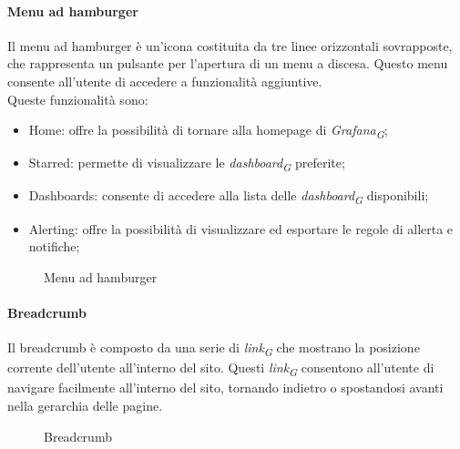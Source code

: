 \paragraph{Menu ad hamburger}
Il menu ad hamburger è un'icona costituita da tre linee orizzontali sovrapposte, che rappresenta un pulsante per l'apertura di un menu a discesa. Questo menu consente all'utente di accedere a funzionalità aggiuntive. \\
Queste funzionalità sono:
\begin{itemize}
    \item Home: offre la possibilità di tornare alla homepage di \textit{Grafana}\textsubscript{\textit{G}};
    \item Starred: permette di visualizzare le \textit{dashboard}\textsubscript{\textit{G}} preferite;
    \item Dashboards: consente di accedere alla lista delle \textit{dashboard}\textsubscript{\textit{G}} disponibili;
    \item Alerting: offre la possibilità di visualizzare ed esportare le regole di allerta e notifiche;
\end{itemize}
\begin{figure}[H]
    \centering
    \caption{Menu ad hamburger}
    \label{fig:my_label}
\end{figure}

\paragraph{Breadcrumb}
Il breadcrumb è composto da una serie di \textit{link}\textsubscript{\textit{G}} che mostrano la posizione corrente dell'utente all'interno del sito. Questi \textit{link}\textsubscript{\textit{G}} consentono all'utente di navigare facilmente all'interno del sito, tornando indietro o spostandosi avanti nella gerarchia delle pagine. \\
\begin{figure}[H]
    \centering
    \caption{Breadcrumb}
    \label{fig:my_label}
\end{figure}

